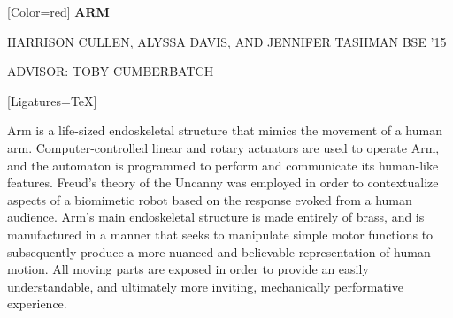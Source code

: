 \documentclass{article}
\begin{document}
{
	[Color=red]
	\fontsize{0.8in}{0.4in}\selectfont 
	\bfseries
	ARM
}

\vspace{0.25in}

{
	\fontsize{0.494in}{0.6in}\selectfont
	HARRISON CULLEN, ALYSSA DAVIS, {\fontsize{0.4in}{0.6in}\selectfont AND}
	 JENNIFER TASHMAN {\fontsize{0.4in}{0.6in}\selectfont BSE '15}
}

\vspace{0.1in}

{
	\fontsize{0.4in}{0.4in}\selectfont
	ADVISOR: TOBY CUMBERBATCH
}

\vspace{0.2in}

{
	[Ligatures=TeX]
	\fontsize{0.4in}{0.46in}\selectfont

    Arm is a life-sized endoskeletal structure that mimics the movement of a
	human arm. Computer-controlled linear and rotary actuators are used to operate
	Arm, and the automaton is programmed to perform and communicate its human-like
	features. Freud’s theory of the Uncanny was employed in order to contextualize
	aspects of a biomimetic robot based on the response evoked from a human
	audience. Arm’s main endoskeletal structure is made entirely of brass, and is
	manufactured in a manner that seeks to manipulate simple motor functions to
	subsequently produce a more nuanced and believable representation of human
	motion. All moving parts are exposed in order to provide an easily
	understandable, and ultimately more inviting, mechanically performative
	experience.

}
\end{document}
